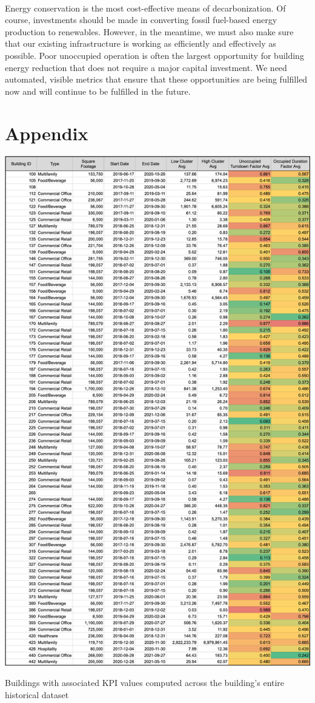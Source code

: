 \documentclass[a4paper]{article}
\begin{document}
\paragraph{}
Energy conservation is the most cost-effective means of decarbonization. Of course, investments should be made in converting fossil fuel-based energy production to renewables. However, in the meantime, we must also make sure that our existing infrastructure is working as efficiently and effectively as possible. Poor unoccupied operation is often the largest opportunity for building energy reduction that does not require a major capital investment. We need automated, visible metrics that ensure that these opportunities are being fulfilled now and will continue to be fulfilled in the future.

\pagebreak
\section{Appendix}

\begin{table}[H]
\includegraphics[width=0.9\columnwidth]{./images/KPI_Result_Table.png}
\caption{Buildings with associated KPI values computed across the building's entire historical dataset}
\end{table}
\end{document}

